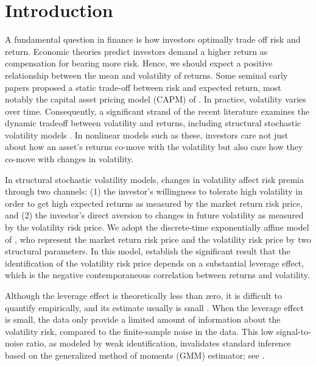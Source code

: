 
\section{Introduction}

A fundamental question in finance is how investors optimally trade off risk and return. Economic theories predict investors demand a higher return as compensation for bearing more risk. Hence, we should expect a positive relationship between the mean and volatility of returns. Some seminal early papers proposed a static trade-off between risk and expected return, most notably the capital asset pricing model (CAPM) of \textcites{sharpe1964capital,lintner1965security}. In practice, volatility varies over time. Consequently, a significant strand of the recent literature examines the dynamic tradeoff between volatility and returns, including structural stochastic volatility models  \parencites{christoffersen2013capturing, bansal2014volatility, dewbecker2017price}.  In nonlinear models such as these, investors care not just about how an asset's returns co-move with the volatility but also care how they co-move with changes in volatility. 

In structural stochastic volatility models, changes in volatility affect risk premia through two channels: (1) the investor's willingness to tolerate high volatility in order to get high expected returns as measured by the market return risk price, and (2) the investor’s direct aversion to changes in future volatility as measured by the volatility risk price. We adopt the discrete-time exponentially affine model of \textcite{han2018leverage}, who represent the market return risk price and the volatility risk price by two structural parameters. In this model,  \textcite{han2018leverage} establish the significant result that the identification of the volatility risk price depends on a substantial leverage effect, which is the negative contemporaneous correlation between returns and volatility. 

Although the leverage effect is theoretically less than zero, it is difficult to quantify empirically, and its estimate usually is small \parencites{aitsahalia2013leverage}. When the leverage effect is small, the data only provide a limited amount of information about the volatility risk, compared to the finite-sample noise in the data. This low signal-to-noise ratio,  as modeled by weak identification, invalidates standard inference based on the generalized method of moments (GMM) estimator; see \textcites{stock2000GMM,andrews2012estimation}.

